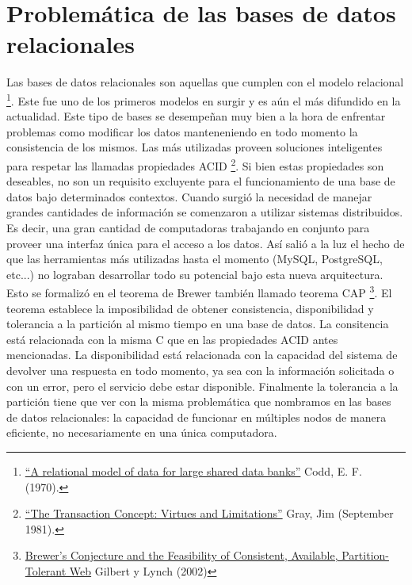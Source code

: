 \documentclass[11pt,a4paper]{article}
\begin{document}
\section{Problemática de las bases de datos relacionales}
Las bases de datos relacionales son aquellas que cumplen con el modelo relacional \footnote{ \href{http://www.seas.upenn.edu/~zives/03f/cis550/codd.pdf}{``A relational model of data for large shared data banks''} Codd, E. F. (1970). }. Este fue uno de los primeros modelos en surgir y es aún el más difundido en la actualidad. Este tipo de bases se desempeñan muy bien a la hora de enfrentar problemas como modificar los datos manteneniendo en todo momento la consistencia de los mismos. Las más utilizadas proveen soluciones inteligentes para respetar las llamadas propiedades ACID \footnote{ \href{http://research.microsoft.com/en-us/um/people/gray/papers/theTransactionConcept.pdf}{``The Transaction Concept: Virtues and Limitations''} Gray, Jim (September 1981).}. Si bien estas propiedades son deseables, no son un requisito excluyente para el funcionamiento de una base de datos bajo determinados contextos. Cuando surgió la necesidad de manejar grandes cantidades de información se comenzaron a utilizar sistemas distribuidos. Es decir, una gran cantidad de computadoras trabajando en conjunto para proveer una interfaz única para el acceso a los datos. Así salió a la luz el hecho de que las herramientas más utilizadas hasta el momento (MySQL, PostgreSQL, etc...) no lograban desarrollar todo su potencial bajo esta nueva arquitectura. Esto se formalizó en el teorema de Brewer también llamado teorema CAP \footnote{ \href{http://webpages.cs.luc.edu/~pld/353/gilbert_lynch_brewer_proof.pdf}{Brewer’s Conjecture and the Feasibility of
Consistent, Available, Partition-Tolerant Web} Gilbert y Lynch (2002)}. El teorema establece la imposibilidad de obtener consistencia, disponibilidad y tolerancia a la partición al mismo tiempo en una base de datos. La consitencia está relacionada con la misma C que en las propiedades ACID antes mencionadas. La disponibilidad está relacionada con la capacidad del sistema de devolver una respuesta en todo momento, ya sea con la información solicitada o con un error, pero el servicio debe estar disponible. Finalmente la tolerancia a la partición tiene que ver con la misma problemática que nombramos en las bases de datos relacionales: la capacidad de funcionar en múltiples nodos de manera eficiente, no necesariamente en una única computadora.
\end{document}
